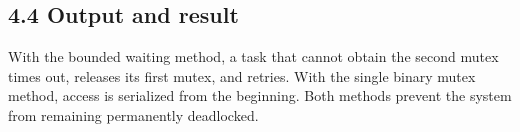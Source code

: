 ﻿\documentclass[12pt,a4paper]{article}
\begin{document}
\subsection*{4.4 Output and result}
With the bounded waiting method, a task that cannot obtain the second mutex
times out, releases its first mutex, and retries. With the single binary
mutex method, access is serialized from the beginning. Both methods prevent
the system from remaining permanently deadlocked.
\end{document}
